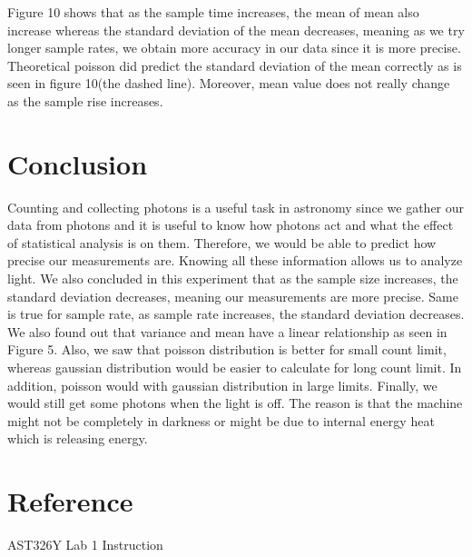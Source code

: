\documentclass[letterpaper,12pt]{article}
\begin{document}
\newpage
Figure 10 shows that as the sample time increases, the mean of mean also increase whereas the standard deviation of the mean decreases, meaning as we try longer sample rates, we obtain more accuracy in our data since it is more precise. Theoretical poisson did predict the standard deviation of the mean correctly as is seen in figure 10(the dashed line). Moreover, mean value does not really change as the sample rise increases.

\newpage
\section{Conclusion}
\label{sec:conclusion}
Counting and collecting photons is a useful task in astronomy since we gather our data from photons and it is useful to know how photons act and what the effect of statistical analysis is on them. Therefore, we would be able to predict how precise our measurements are. Knowing all these information allows us to analyze light.
We also concluded in this experiment that as the sample size increases, the standard deviation decreases, meaning our measurements are more precise. Same is true for sample rate, as sample rate increases, the standard deviation decreases. We also found out that variance and mean have a linear relationship as seen in Figure 5.
Also, we saw that poisson distribution is better for small count limit, whereas gaussian distribution would be easier to calculate for long count limit. In addition, poisson would  with gaussian distribution in large limits. 
Finally, we would still get some photons when the light is off. The reason is that the machine might not be completely in darkness or might be due to internal energy heat which is releasing energy.

\section{Reference}
\label{sec:reference}
AST326Y Lab 1 Instruction
\end{document}

